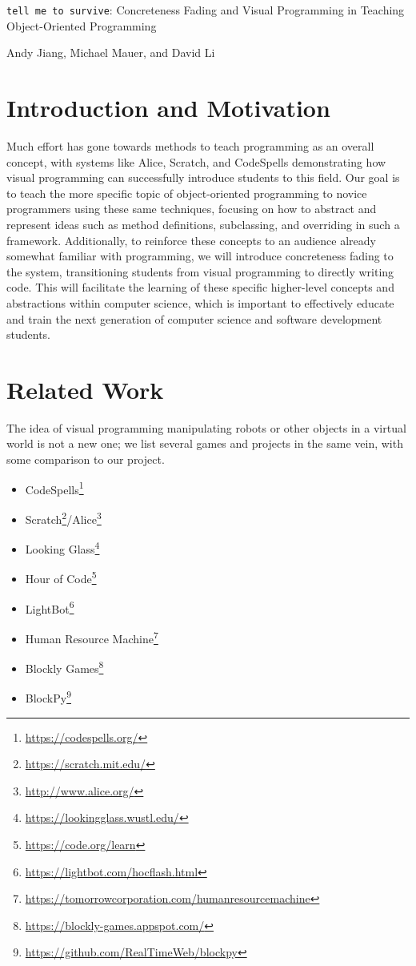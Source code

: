 \documentclass[12pt,notitlepage]{article}
\newcommand\footnoteref[1]{\footnote{\url{#1}}}
\begin{document}
\begingroup
  \centering
  {\Large \texttt{tell me to survive}: Concreteness Fading and Visual
    Programming in Teaching Object-Oriented Programming\\[1em]}

  Andy Jiang, Michael Mauer, and David Li\par
\endgroup

\section{Introduction and Motivation}

Much effort has gone towards methods to teach programming as an
overall concept, with systems like Alice, Scratch, and CodeSpells
demonstrating how visual programming can successfully introduce
students to this field. Our goal is to teach the more specific topic
of object-oriented programming to novice programmers using these same
techniques, focusing on how to abstract and represent ideas such as
method definitions, subclassing, and overriding in such a framework.
Additionally, to reinforce these concepts to an audience already
somewhat familiar with programming, we will introduce concreteness
fading to the system, transitioning students from visual programming
to directly writing code. This will facilitate the learning of these
specific higher-level concepts and abstractions within computer
science, which is important to effectively educate and train the next
generation of computer science and software development students.

\section{Related Work}

The idea of visual programming manipulating robots or other objects in
a virtual world is not a new one; we list several games and projects
in the same vein, with some comparison to our project.

\begin{multicols}{2}
\begin{itemize}
\item CodeSpells\footnoteref{https://codespells.org/}
\item Scratch\footnoteref{https://scratch.mit.edu/}/Alice\footnoteref{http://www.alice.org/}
\item Looking Glass\footnoteref{https://lookingglass.wustl.edu/}
\item Hour of Code\footnoteref{https://code.org/learn}
\item LightBot\footnoteref{https://lightbot.com/hocflash.html}
\item Human Resource Machine\footnoteref{https://tomorrowcorporation.com/humanresourcemachine}
\item Blockly Games\footnoteref{https://blockly-games.appspot.com/}
\item BlockPy\footnoteref{https://github.com/RealTimeWeb/blockpy}
\end{itemize}
\end{multicols}
\end{document}
